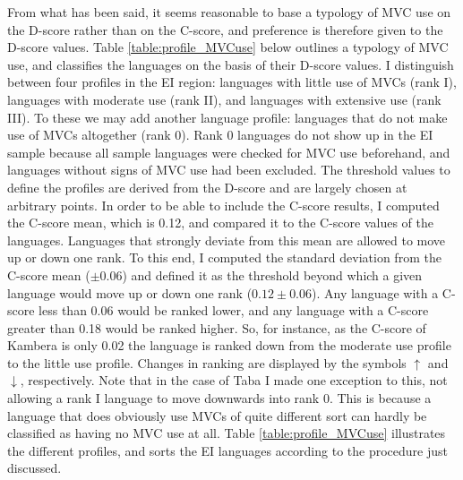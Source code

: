 From what has been said, it seems reasonable to base a typology of MVC use on the D-score rather than on the C-score, and preference is therefore given to the D-score values. Table \ref{table:profile_MVCuse} below outlines a typology of MVC use, and classifies the languages on the basis of their D-score values. I distinguish between four profiles in the EI region: languages with little use of MVCs (rank I), languages with moderate use (rank II), and languages with extensive use (rank III). To these we may add another language profile: languages that do not make use of MVCs altogether (rank 0). Rank 0 languages do not show up in the EI sample because all sample languages were checked for MVC use beforehand, and languages without signs of MVC use had been excluded. The threshold values to define the profiles are derived from the D-score and are largely chosen at arbitrary points. In order to be able to include the C-score results, I computed the C-score mean, which is 0.12, and compared it to the C-score values of the languages. Languages that strongly deviate from this mean are allowed to move up or down one rank. To this end, I computed the standard deviation from the C-score mean ($\pm 0.06$) and defined it as the threshold beyond which a given language would move up or down one rank ($0.12 \pm 0.06$). Any language with a C-score less than 0.06 would be ranked lower, and any language with a C-score greater than 0.18 would be ranked higher. So, for instance, as the C-score of Kambera is only 0.02 the language is ranked down from the moderate use profile to the little use profile. Changes in ranking are displayed by the symbols $\uparrow$ and $\downarrow$, respectively. Note that in the case of Taba I made one exception to this, not allowing a rank I language to move downwards into rank 0. This is because a language that does obviously use MVCs of quite different sort can hardly be classified as having no MVC use at all. Table \ref{table:profile_MVCuse} illustrates the different profiles, and sorts the EI languages according to the procedure just discussed.

